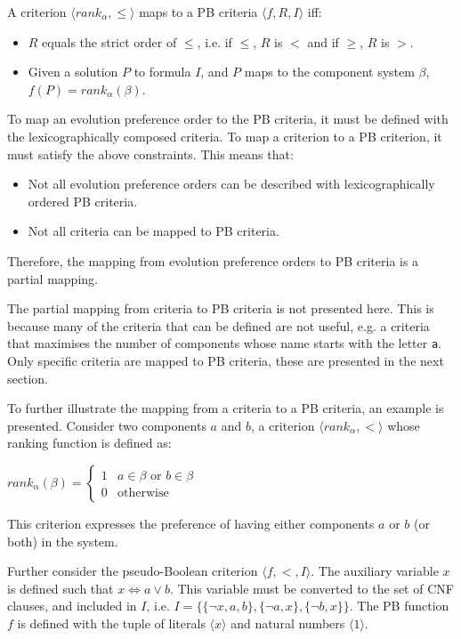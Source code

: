A criterion $\langle rank_{\alpha} ,\leq \rangle$ maps to a PB criteria $\langle f, R , I \rangle$ iff:
\begin{itemize}
  \item $R$ equals the strict order of $\leq$, i.e. if $\leq$, $R$ is $<$ and if $\geq$, $R$ is $>$.
  \item Given a solution $P$ to formula $I$, and $P$ maps to the component system $\beta$, $f(P) = rank_{\alpha}(\beta)$. 
\end{itemize} 

To map an evolution preference order to the PB criteria,
it must be defined with the lexicographically composed criteria.
To map a \modelname criterion to a PB criterion, it must satisfy the above constraints.
This means that:
\begin{itemize}
  \item Not all evolution preference orders can be described with lexicographically ordered PB criteria.
  \item Not all \modelname criteria can be mapped to PB criteria.
\end{itemize} 
Therefore, the mapping from evolution preference orders to PB criteria is a partial mapping.

The partial mapping from \modelname criteria to PB criteria is not presented here.
This is because many of the \modelname criteria that can be defined are not useful, 
e.g. a criteria that maximises the number of components whose name starts with the letter \texttt{a}.
Only specific criteria are mapped to PB criteria, these are presented in the next section. 

To further illustrate the mapping from a \modelname criteria to a PB criteria, an example is presented.
Consider two components $a$ and $b$, a criterion $\langle rank_{\alpha},< \rangle$ whose ranking function is defined as:

$rank_{\alpha}(\beta) = \begin{cases} 1 & a \in \beta \text{ or } b \in \beta\\ 0 & \text{otherwise} \end{cases}$

This criterion expresses the preference of having either components $a$ or $b$ (or both) in the system.

Further consider the pseudo-Boolean criterion $\langle f, < , I \rangle$.
The auxiliary variable $x$ is defined such that $x \Leftrightarrow a \vee b$.
This variable must be  converted to the set of CNF clauses, and included in $I$,
i.e. $I = \{\{\neg x, a,b\}, \{\neg a,x\}, \{\neg b, x \}\}$.
The PB function $f$ is defined with the tuple of literals $\langle x \rangle$ and natural numbers $\langle 1 \rangle$.

